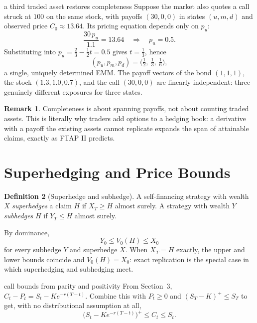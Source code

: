 \documentclass[10pt]{article}
\newcommand{\1}{\mathbf 1}
\theoremstyle{definition}
\newtheorem{definition}{Definition}[section]
\newtheorem{remark}[definition]{Remark}
\begin{document}
\begin{boardexample}{a third traded asset restores completeness}
Suppose the market also quotes a call struck at \(100\) on the same stock,
with payoffs \((30,0,0)\) in states \((u,m,d)\) and observed price
\(C_0\approx13.64\). Its pricing equation depends only on \(p_u\):
\[
\frac{30\,p_u}{1.1}=13.64
\quad\Longrightarrow\quad
p_u=0.5.
\]
Substituting into \(p_u=\tfrac23-\tfrac12t=0.5\) gives \(t=\tfrac13\), hence
\[
\boxed{(p_u,p_m,p_d)=\bigl(\tfrac12,\ \tfrac13,\ \tfrac16\bigr),}
\]
a single, uniquely determined EMM. The payoff vectors of the bond
\((1,1,1)\), the stock \((1.3,1.0,0.7)\), and the call \((30,0,0)\) are
linearly independent: three genuinely different exposures for three states.
\end{boardexample}

\begin{remark}
Completeness is about spanning payoffs, not about counting traded assets.
This is literally why traders add options to a hedging book: a derivative
with a payoff the existing assets cannot replicate expands the span of
attainable claims, exactly as FTAP II predicts.
\end{remark}

\section{Superhedging and Price Bounds}

\begin{definition}[Superhedge and subhedge]
A self-financing strategy with wealth \(X\) \emph{superhedges} a claim \(H\)
if \(X_T\geq H\) almost surely. A strategy with wealth \(Y\)
\emph{subhedges} \(H\) if \(Y_T\leq H\) almost surely.
\end{definition}

By dominance,
\[
\boxed{Y_0\leq V_0(H)\leq X_0}
\]
for every subhedge \(Y\) and superhedge \(X\). When \(X_T=H\) exactly, the
upper and lower bounds coincide and \(V_0(H)=X_0\): exact replication is the
special case in which superhedging and subhedging meet.

\begin{boardexample}{call bounds from parity and positivity}
From Section~3, \(C_t-P_t=S_t-Ke^{-r(T-t)}\). Combine this with \(P_t\geq0\)
and \((S_T-K)^+\leq S_T\) to get, with no distributional assumption at all,
\[
\boxed{
\bigl(S_t-Ke^{-r(T-t)}\bigr)^+\leq C_t\leq S_t.}
\]
\end{boardexample}
\end{document}

